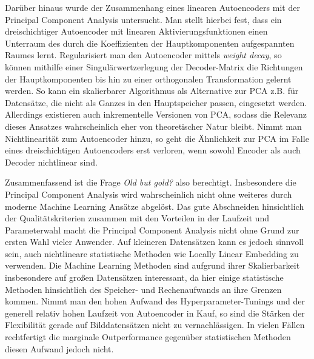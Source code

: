 Darüber hinaus wurde der Zusammenhang eines linearen Autoencoders mit der Principal Component
Analysis untersucht. Man stellt hierbei fest, dass ein dreischichtiger Autoencoder mit linearen
Aktivierungsfunktionen einen Unterraum des durch die Koeffizienten der Hauptkomponenten
aufgespannten Raumes lernt. Regularisiert man den Autoencoder mittels \textit{weight decay}, so
können mithilfe einer Singulärwertzerlegung der Decoder-Matrix die Richtungen der Hauptkomponenten
bis hin zu einer orthogonalen Transformation gelernt werden. So kann ein skalierbarer Algorithmus
als Alternative zur PCA z.B. für Datensätze, die nicht als Ganzes in den Hauptspeicher passen,
eingesetzt werden. Allerdings existieren auch inkrementelle Versionen von PCA, sodass die Relevanz
dieses Ansatzes wahrscheinlich eher von theoretischer Natur bleibt. Nimmt man Nichtlinearität zum
Autoencoder hinzu, so geht die Ähnlichkeit zur PCA im Falle eines dreischichtigen Autoencoders erst
verloren, wenn sowohl Encoder als auch Decoder nichtlinear sind.

Zusammenfassend ist die Frage \textit{Old but gold?} also berechtigt. Insbesondere die Principal
Component Analysis wird wahrscheinlich nicht ohne weiteres durch moderne Machine Learning Ansätze
abgelöst. Das gute Abschneiden hinsichtlich der Qualitätskriterien zusammen mit den Vorteilen in
der Laufzeit und Parameterwahl macht die Principal Component Analysis nicht ohne Grund zur ersten
Wahl vieler Anwender. Auf kleineren Datensätzen kann es jedoch sinnvoll sein, auch nichtlineare
statistische Methoden wie Locally Linear Embedding zu verwenden. Die Machine Learning Methoden sind
aufgrund ihrer Skalierbarkeit insbesondere auf großen Datensätzen interessant, da hier einige
statistische Methoden hinsichtlich des Speicher- und Rechenaufwands an ihre Grenzen kommen. Nimmt
man den hohen Aufwand des Hyperparameter-Tunings und der generell relativ hohen Laufzeit von
Autoencoder in Kauf, so sind die Stärken der Flexibilität gerade auf Bilddatensätzen nicht zu
vernachlässigen. In vielen Fällen rechtfertigt die marginale Outperformance gegenüber statistischen
Methoden diesen Aufwand jedoch nicht.